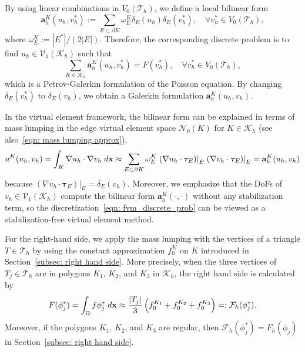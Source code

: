 \documentclass[a4paper]{article}
\theoremstyle{plain}
\theoremstyle{definition}
\numberwithin{equation}{section}
\newcommand{\bx}{{\bf x}}
\newcommand{\Th}{\mathcal{T}_h}
\newcommand{\Kh}{\mathcal{K}_h}
\begin{document}
By using linear combinations in $V_0(\Th)$, we define a local bilinear form
\begin{equation*}
\mathbf{a}_h^K(u_h, v_h^{*}):=\sum_{E\subset \partial K}\omega_E^K\delta_E(u_h)\delta_E(v_h^{*}),\quad \forall v_h^{*}\in V_0(\mathcal{T}_h),
\end{equation*}
where $\omega_E^K:=|E^*|/(2|E|)$.
Therefore, the corresponding discrete problem is to find $u_h\in \mathcal V_1(\Kh)$ such that
\begin{equation}
\sum_{K\in\Kh}\mathbf{a}_h^K(u_h, v_h^{*})=F(v_h^{*}),\quad \forall v_h^{*}\in V_0(\mathcal{T}_h),\label{eqn: fvm_discrete_prob}
\end{equation}
which is a Petrov-Galerkin formulation of the Poisson equation. By changing $\delta_E(v_h^{*})$ to $\delta_E(v_h)$, we obtain a Galerkin formulation $\mathbf{a}_h^K(u_h, v_h)$.




In the virtual element framework, the bilinear form can be explained in terms of mass lumping in the edge virtual element space $\mathcal{N}_0(K)$ for $K\in \Kh$ (see also~\eqref{eqn: mass lumping approx}),
\begin{equation}
a^K(u_h,v_h)=\int_K\nabla u_h\cdot\nabla v_h\;{\rm d}\bx\approx \sum_{E\subset \partial K}\omega_E^K\left.(\nabla u_h\cdot\bm{\tau}_E)\right|_E\left.(\nabla v_h\cdot\bm{\tau}_E)\right|_E=\mathbf{a}_h^K(u_h, v_h)\label{eqn: vem_mass_lump}
\end{equation}
because $\left.(\nabla v_h\cdot\bm{\tau}_E)\right|_E=\delta_E(v_h)$.
Moreover, we emphasize that the DoFs of $v_h\in \mathcal V_1(\Kh)$ compute the bilinear form $\mathbf{a}_h^K(\cdot,\cdot)$ without any stabilization term, so the discretization~\eqref{eqn: fvm_discrete_prob} can be viewed as a stabilization-free virtual element method.

For the right-hand side, we apply the mass lumping with the vertices of a triangle $T\in \Th$ by using the constant approximation $f_0^K$ on $K$ introduced in Section~\ref{subsec: right hand side}.
More precisely, when the three vertices of $T_j\in \Th$ are in polygons $K_1$, $K_2$, and $K_3$ in $\Kh$, the right hand side is calculated by
\begin{equation}
F(\phi_j^{*})=\int_{\Omega} f\phi_j^{*}\;{\rm d}\bx\approx\frac{|T_j|}{3}\left(f_0^{K_1}+f_0^{K_2}+f_0^{K_3}\right)=:\mathcal{F}_h(\phi_j^{*}).\label{eqn: fvm_rhs}
\end{equation}
Moreover, if the polygons $K_1$, $K_2$, and $K_3$ are regular, then $\mathcal{F}_h(\phi_j^*)=F_h(\phi_j)$ in Section~\ref{subsec: right hand side}.
\end{document}
